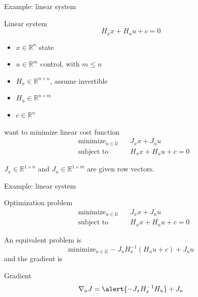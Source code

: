 \documentclass[xcolor=svgnames, english, smaller]{beamer}
\theoremstyle{plain}
\theoremstyle{definition}
\theoremstyle{plain}
\theoremstyle{plain}
\newcommand \Rbb{\mathbb{R}}
\newcommand \Ucal{\mathcal{U}}
\begin{document}
\newcommand \xuVector{\left[\begin{array}{c} x \\ u \end{array} \right]}
\begin{frame}{Example: linear system}

\begin{block}{Linear system}
\[
H_x x + H_u u + c = 0
\]
\end{block}

\begin{itemize}
\item $x \in \Rbb^{n}$ state
\item $u \in \Rbb^{m}$ control, with $m \leq n$
\item $H_x \in \Rbb^{n \times n}$, assume invertible
\item $H_u \in \Rbb^{n \times m}$
\item $c \in \Rbb^n$
\end{itemize}

want to minimize linear cost function
\[
\begin{aligned}
&\text{minimize}_{u \in \Ucal} && J_x x + J_u u \\
&\text{subject to} && H_x x + H_u u + c = 0
\end{aligned}
\]

$J_x \in \Rbb^{1\times n}$ and $J_u \in \Rbb^{1 \times m}$ are given row vectors.

\end{frame}


\begin{frame}{Example: linear system}

\begin{block}{Optimization problem}
\[
\begin{aligned}
&\text{minimize}_{u \in \Ucal} && J_x x + J_u u \\
&\text{subject to} && H_x x + H_u u + c = 0
\end{aligned}
\]
\end{block}
An equivalent problem is
\[
\text{minimize}_{u \in \Ucal} - J_x H_x^{-1}(H_u u + c) + J_u u
\]
and the gradient is
\begin{block}{Gradient}
\[
\nabla_u J = \alert{- J_x H_x^{-1} H_u} + J_u
\]
\end{block}

\end{frame}
\end{document}
